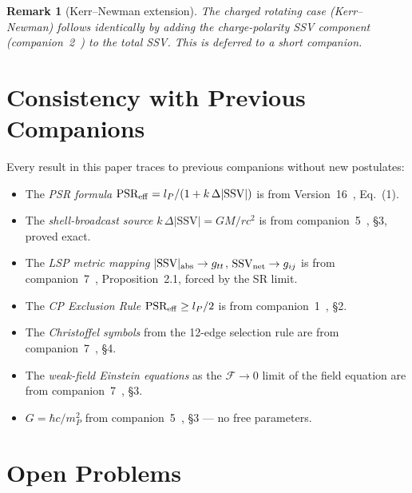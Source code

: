 \documentclass[12pt]{article}
\newtheorem{remark}[theorem]{Remark}
\newcommand{\lP}{l_P}
\newcommand{\mP}{m_P}
\newcommand{\SSV}{\text{SSV}}
\newcommand{\PSR}{\text{PSR}}
\begin{document}
\begin{remark}[Kerr--Newman extension]
The charged rotating case (Kerr--Newman) follows identically by
adding the charge-polarity SSV component (companion~2~\cite{c2})
to the total SSV.  This is deferred to a short companion.
\end{remark}

\section{Consistency with Previous Companions}
\label{sec:consistency}

Every result in this paper traces to previous companions without new
postulates:

\begin{itemize}[noitemsep]
  \item The \emph{PSR formula} $\PSR_{\rm eff} = \lP/(1+k\,\Delta|\SSV|)$
    is from Version~16~\cite{v16}, Eq.~(1).
  \item The \emph{shell-broadcast source} $k\,\Delta|\SSV| = GM/rc^2$
    is from companion~5~\cite{c5}, §3, proved exact.
  \item The \emph{LSP metric mapping} $|\SSV|_{\rm abs} \to g_{tt}$,
    $\SSV_{\rm net} \to g_{ij}$ is from companion~7~\cite{c7},
    Proposition~2.1, forced by the SR limit.
  \item The \emph{CP Exclusion Rule} $\PSR_{\rm eff} \geq \lP/2$ is
    from companion~1~\cite{c1}, §2.
  \item The \emph{Christoffel symbols} from the 12-edge selection rule
    are from companion~7~\cite{c7}, §4.
  \item The \emph{weak-field Einstein equations} as the $\mathcal{F} \to 0$
    limit of the field equation are from companion~7~\cite{c7}, §3.
  \item $G = \hbar c/\mP^2$ from companion~5~\cite{c5}, §3 ---
    no free parameters.
\end{itemize}

\section{Open Problems}
\label{sec:open}
\end{document}
